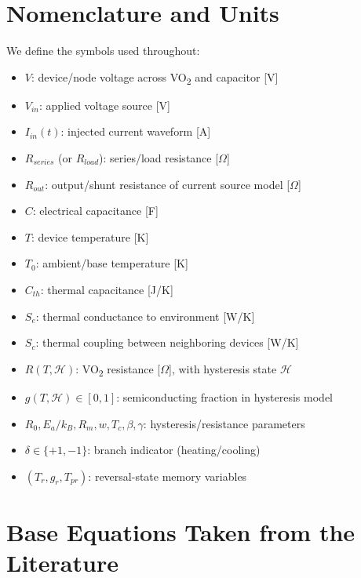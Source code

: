 \documentclass[11pt]{article}
\begin{document}
\section{Nomenclature and Units}

We define the symbols used throughout:

\begin{itemize}
    \item \(V\): device/node voltage across VO\textsubscript{2} and capacitor [V]
    \item \(V_{in}\): applied voltage source [V]
    \item \(I_{in}(t)\): injected current waveform [A]
    \item \(R_{series}\) (or \(R_{load}\)): series/load resistance [\(\Omega\)]
    \item \(R_{out}\): output/shunt resistance of current source model [\(\Omega\)]
    \item \(C\): electrical capacitance [F]
    \item \(T\): device temperature [K]
    \item \(T_0\): ambient/base temperature [K]
    \item \(C_{th}\): thermal capacitance [J/K]
    \item \(S_e\): thermal conductance to environment [W/K]
    \item \(S_c\): thermal coupling between neighboring devices [W/K]
    \item \(R(T,\mathcal{H})\): VO\textsubscript{2} resistance [\(\Omega\)], with hysteresis state \(\mathcal{H}\)
    \item \(g(T,\mathcal{H})\in[0,1]\): semiconducting fraction in hysteresis model
    \item \(R_0, E_a/k_B, R_m, w, T_c, \beta, \gamma\): hysteresis/resistance parameters
    \item \(\delta\in\{+1,-1\}\): branch indicator (heating/cooling)
    \item \((T_r,g_r,T_{pr})\): reversal-state memory variables
\end{itemize}

\section{Base Equations Taken from the Literature}
\end{document}
